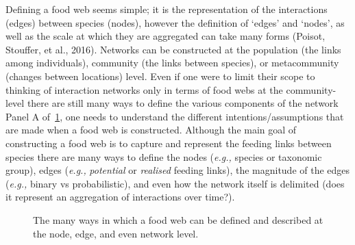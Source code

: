 \documentclass[
]{article}
\begin{document}
Defining a food web seems simple; it is the representation of the
interactions (edges) between species (nodes), however the definition of
`edges' and `nodes', as well as the scale at which they are aggregated
can take many forms (Poisot, Stouffer, et al., 2016). Networks can be
constructed at the population (the links among individuals), community
(the links between species), or metacommunity (changes between
locations) level. Even if one were to limit their scope to thinking of
interaction networks only in terms of food webs at the community-level
there are still many ways to define the various components of the
network Panel A of~\ref{fig-anatomy}, one needs to understand the
different intentions/assumptions that are made when a food web is
constructed. Although the main goal of constructing a food web is to
capture and represent the feeding links between species there are many
ways to define the nodes (\emph{e.g.,} species or taxonomic group),
edges (\emph{e.g.,} \emph{potential} or \emph{realised} feeding links),
the magnitude of the edges (\emph{e.g.,} binary vs probabilistic), and
even how the network itself is delimited (does it represent an
aggregation of interactions over time?).

\begin{figure}


\caption{\label{fig-anatomy}The many ways in which a food web can be
defined and described at the node, edge, and even network level.}

\end{figure}%
\end{document}
